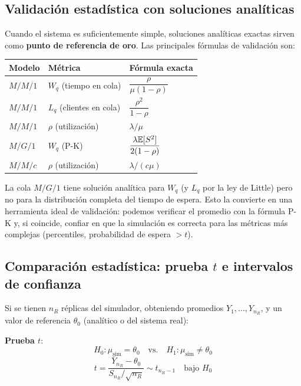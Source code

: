 \documentclass[11pt, letterpaper]{article}
\begin{document}
\subsection{Validación estadística con soluciones analíticas}

Cuando el sistema es suficientemente simple, soluciones analíticas exactas sirven como \textbf{punto de referencia de oro}. Las principales fórmulas de validación son:

\begin{center}
\small
\renewcommand{\arraystretch}{1.4}
\begin{tabular}{lll}
\toprule
\textbf{Modelo} & \textbf{Métrica} & \textbf{Fórmula exacta} \\
\midrule
$M/M/1$  & $W_q$ (tiempo en cola) & $\dfrac{\rho}{\mu(1-\rho)}$ \\[8pt]
$M/M/1$  & $L_q$ (clientes en cola)& $\dfrac{\rho^2}{1-\rho}$ \\[8pt]
$M/M/1$  & $\rho$ (utilización)    & $\lambda/\mu$ \\[8pt]
$M/G/1$  & $W_q$ (P-K)             & $\dfrac{\lambda\mathbb{E}[S^2]}{2(1-\rho)}$ \\[8pt]
$M/M/c$  & $\rho$ (utilización)    & $\lambda/(c\mu)$ \\
\bottomrule
\end{tabular}
\end{center}

\begin{notabox}
La cola $M/G/1$ tiene solución analítica para $W_q$ (y $L_q$ por la ley de Little) pero no para la distribución completa del tiempo de espera. Esto la convierte en una herramienta ideal de validación: podemos verificar el promedio con la fórmula P-K y, si coincide, confiar en que la simulación es correcta para las métricas más complejas (percentiles, probabilidad de espera $>t$).
\end{notabox}

\subsection{Comparación estadística: prueba $t$ e intervalos de confianza}

Si se tienen $n_R$ réplicas del simulador, obteniendo promedios $Y_1, \ldots, Y_{n_R}$, y un valor de referencia $\theta_0$ (analítico o del sistema real):

\textbf{Prueba $t$}:
\[
H_0: \mu_{\text{sim}} = \theta_0 \quad \text{vs.} \quad H_1: \mu_{\text{sim}} \ne \theta_0
\]
\[
t = \frac{\bar Y_{n_R} - \theta_0}{S_{n_R}/\sqrt{n_R}} \sim t_{n_R-1} \quad \text{bajo } H_0
\]
\end{document}
